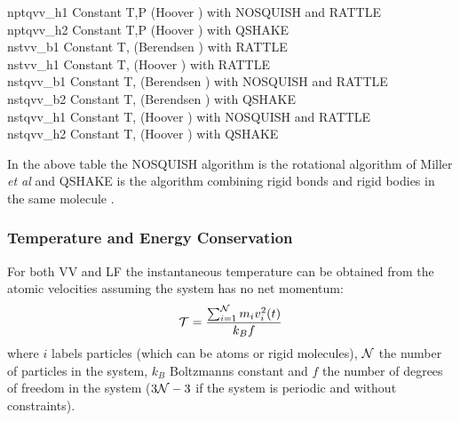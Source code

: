\begin{tabbing}
{\sc nptqvv\_h1}  \>  Constant T,P (Hoover \cite{hoover-85a}) with NOSQUISH and RATTLE\\
{\sc nptqvv\_h2}  \>  Constant T,P (Hoover \cite{hoover-85a}) with QSHAKE \\
{\sc nstvv\_b1}   \>  Constant T,\mat{\sigma} (Berendsen \cite{berendsen-84a}) with RATTLE \\
{\sc nstvv\_h1}   \>  Constant T,\mat{\sigma} (Hoover \cite{hoover-85a}) with RATTLE \\
{\sc nstqvv\_b1}  \>  Constant T,\mat{\sigma} (Berendsen \cite{berendsen-84a}) with NOSQUISH and RATTLE\\
{\sc nstqvv\_b2}  \>  Constant T,\mat{\sigma} (Berendsen \cite{berendsen-84a}) with QSHAKE \\
{\sc nstqvv\_h1}  \>  Constant T,\mat{\sigma} (Hoover \cite{hoover-85a}) with
NOSQUISH and RATTLE\\
{\sc nstqvv\_h2}  \>  Constant T,\mat{\sigma} (Hoover \cite{hoover-85a}) with QSHAKE \\
\end{tabbing}

In the above table the NOSQUISH algorithm is
the rotational algorithm of Miller {\em et al} \cite{miller-02a} and
QSHAKE is the \D{} algorithm combining rigid
bonds and rigid bodies in the same molecule
\cite{forester-96a}.

\subsubsection{Temperature and Energy Conservation}

For both VV and LF the instantaneous temperature can be obtained
from the atomic velocities assuming the system has no net momentum:
\begin{equation}
{\cal  T} = {\sum_{i=1}^{\cal N} m_i v^2_i(t) \over  k_B f} 
\end{equation}
where $i$ labels particles (which can be atoms or rigid molecules),
${\cal N}$ the number of particles in the system, $k_B$ Boltzmanns
constant and $f$ the number of degrees of freedom in the system
($3{\cal N} - 3$ if the system is periodic and without constraints).

